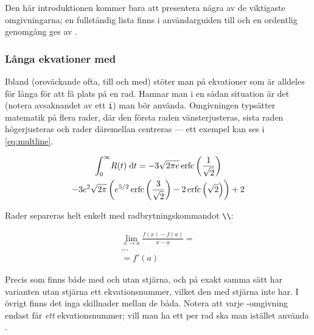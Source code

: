 \documentclass[lang=sv,ptsize=10pt,font=none,nomath,titles=bf,../../a4.tex]{subfiles}
\begin{document}
Den här introduktionen kommer bara att presentera några av de viktigaste
omgivningarna; en fullständig lista finns i användarguiden till
 \parencite{AMS99} och en ordentlig genomgång ges av
\textcite{Voss10}.

\subsubsection{Långa ekvationer med }
Ibland (oroväckande ofta, till och med) stöter man på ekvationer som är
alldeles för långa för att få plats på en rad. Hamnar man i en sådan
situation är det  (notera avsaknandet av ett \texttt{i})
man bör använda. Omgivningen typsätter matematik på flera rader, där den
första raden vänsterjusteras, sista raden högerjusteras och rader 
däremellan centreras — ett exempel kan ses i \cref{eq:multline}.

\begin{multline}\label{eq:multline}
	\int_0^\infty\!R(t)\d{t} = -3\sqrt{2\pi 
	e}\erfc\left(\frac{1}{\sqrt{2}}\right) \\
	-3e^2\sqrt{2\pi}\left(e^{5/2}\erfc\left(
	\frac{3}{\sqrt{2}}\right) - 2\erfc\left(
	\sqrt{2}\right)\right) + 2
\end{multline}

Rader separeras helt enkelt med radbrytningskommandot \verb|\\|:
\begin{latexcode}
\begin{multline}
\lim_{x\to a} \frac{f(x) - f(a)}{x - a} = \\
\ldots \\
= f'(a)
\end{multline}
\end{latexcode}

Precis som  finns  både med och utan stjärna,
och på exakt samma sätt har varianten utan stjärna ett ekvationsnummer,
vilket den med stjärna inte har. I övrigt finns det inga skillnader mellan
de båda. Notera att varje -omgivning endast får \emph{ett}
ekvationsnummer; vill man ha ett per rad ska man istället använda
.
\end{document}
